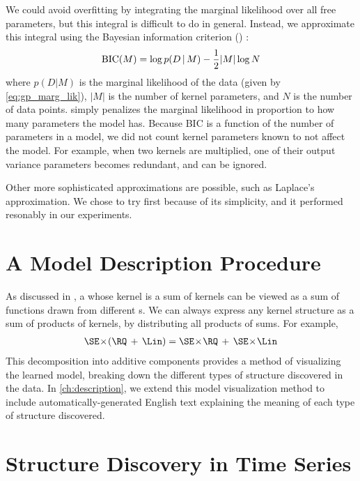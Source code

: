 We could avoid overfitting by integrating the marginal likelihood over all free parameters, but this integral is difficult to do in general.
Instead, we approximate this integral using the Bayesian information criterion (\BIC{}) \citep{schwarz1978estimating}:
%
\begin{equation}
\textrm{BIC}(M) = \log p(D \,|\, M) - \frac{1}{2} |M| \log N
\end{equation}
%
where $p(D|M)$ is the marginal likelihood of the data (given by \cref{eq:gp_marg_lik}), $|M|$ is the number of kernel parameters, and $N$ is the number of data points.
\BIC{} simply penalizes the marginal likelihood in proportion to how many parameters the model has.
Because BIC is a function of the number of parameters in a model, we did not count kernel parameters known to not affect the model.
For example, when two kernels are multiplied, one of their output variance parameters becomes redundant, and can be ignored.

Other more sophisticated approximations are possible, such as Laplace's approximation.
We chose to try \BIC{} first because of its simplicity, and it performed resonably in our experiments.




\section{A Model Description Procedure}

As discussed in , a \gp{} whose kernel is a sum of kernels can be viewed as a sum of functions drawn from different \gp{}s.
We can always express any kernel structure as a sum of products of kernels, by distributing all products of sums.
For example,
%
\begin{align}
\SE \kerntimes (\RQ \kernplus \Lin) = \SE \kerntimes  \RQ \kernplus \SE \kerntimes \Lin
\end{align}
%
This decomposition into additive components provides a method of visualizing the learned model, breaking down the different types of structure discovered in the data.
In \cref{ch:description}, we extend this model visualization method to include automatically-generated English text explaining the meaning of each type of structure discovered.



\section{Structure Discovery in Time Series}
\label{sec:time_series}

